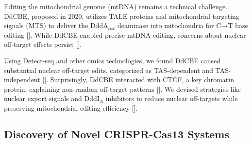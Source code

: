 \documentclass[12pt]{article}
\begin{document}


Editing the mitochondrial genome (mtDNA) remains a technical challenge. DdCBE, proposed in 2020, 
utilizes TALE proteins and mitochondrial targeting signals (MTS) to deliver the DddA$_{tox}$ deaminase into mitochondria for C→T base editing [\cite{mok2020}]. 
While DdCBE enabled precise mtDNA editing, concerns about nuclear off-target effects persist [\cite{mok2020}].  
  
Using Detect-seq and other omics technologies, we found DdCBE caused substantial nuclear off-target edits, 
categorized as TAS-dependent and TAS-independent [\cite{lei2022}]. 
Surprisingly, DdCBE interacted with CTCF, a key chromatin protein, explaining non-random off-target patterns [\cite{lei2022}]. 
We devised strategies like nuclear export signals and DddI$_A$ inhibitors to reduce nuclear off-targets while preserving mitochondrial editing efficiency [\cite{lei2022}]. 
 
  

\subsection*{Discovery of Novel CRISPR-Cas13 Systems}


\end{document}
